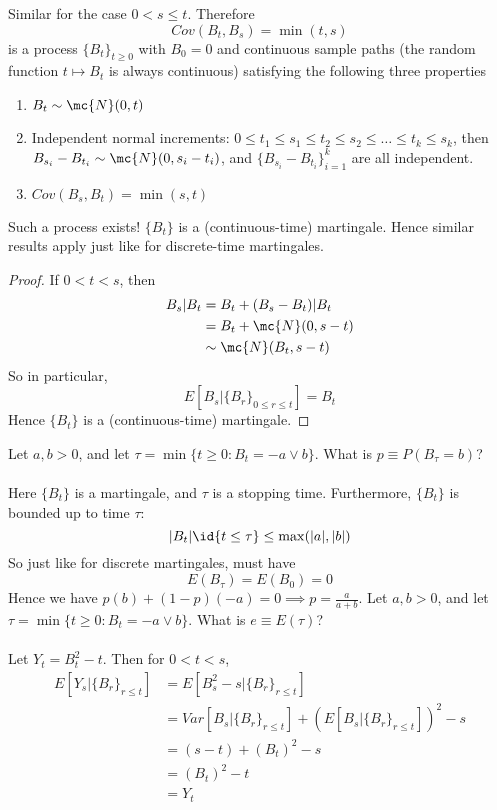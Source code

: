 \documentclass[11pt]{article}
\begin{document}
    Similar for the case $0 < s \leq t$. Therefore
    $$Cov(B_t, B_s) = \min(t,s)$$
     is a process $\{B_t\}_{t\geq 0}$ with $B_0 = 0$ and continuous sample paths (the random function $t \mapsto B_t$ is always continuous) satisfying the following  three properties 
    \begin{enumerate}
    	\item $B_t \sim \mc{N}(0,t)$
    	\item Independent normal increments:
    $0 \leq t_1 \leq s_1 \leq t_2 \leq s_2 \leq \hdots \leq t_k \leq s_k$, then $B_{s_i} - B_{t_i} \sim \mc{N}(0, s_i - t_i)$, and $\{B_{s_i} - B_{t_i}\}_{i=1}^k$ are all independent.
    	\item $Cov(B_s, B_t) = \min(s,t)$
    \end{enumerate}
    \remark
    Such a process exists!
    \fact
    $\{B_t\}$ is a (continuous-time) martingale. Hence similar results apply just like for discrete-time martingales.
    \begin{proof}
    	If $0 < t < s$, then 
    	\begin{align*}
    		B_s | B_t &= B_t + (B_s - B_t) | B_t \\
    		&= B_t + \mc{N}(0, s-t) \\
    		&\sim \mc{N}(B_t, s-t)
    	\end{align*}
    	So in particular, $$E[B_s | \{B_r\}_{0 \leq r \leq t}] = B_t$$
    	Hence $\{B_t\}$ is a (continuous-time) martingale.
    \end{proof}
    \example Let $a,b > 0$, and let $\tau = \min\{t \geq 0: B_t = -a \lor b\}$. What is $p \equiv P(B_{\tau} = b)$?\\
    \\
    Here $\{B_t\}$ is a martingale, and $\tau$ is a stopping time. Furthermore, $\{B_t\}$ is bounded up to time $\tau$: 
    $$|B_t|\id{t\leq \tau} \leq \max(|a|, |b|)$$
    So just like for discrete martingales, must have 
    $$E(B_{\tau}) = E(B_0) = 0$$
    Hence we have $p(b) + (1-p)(-a) = 0 \implies p = \frac{a}{a+b}$.
    \example Let $a,b > 0$, and let $\tau = \min\{t \geq 0: B_t = -a \lor b\}$. What is $e \equiv E(\tau)$?\\
    \\
    Let $Y_t = B_t^2 - t$.
    Then for $0 < t < s$, 
    \begin{align*}
    	E[Y_s | \{B_r\}_{r \leq t}] &= E[B_s^2 - s | \{B_r\}_{r \leq t}] \\
    	&= Var[B_s | \{B_r\}_{r \leq t}] + (E[B_s|\{B_r\}_{r \leq t}])^2 - s \\
    	&= (s-t) + (B_t)^2 - s \\
    	&= (B_t)^2 - t \\
    	&= Y_t
    \end{align*}
\end{document}
